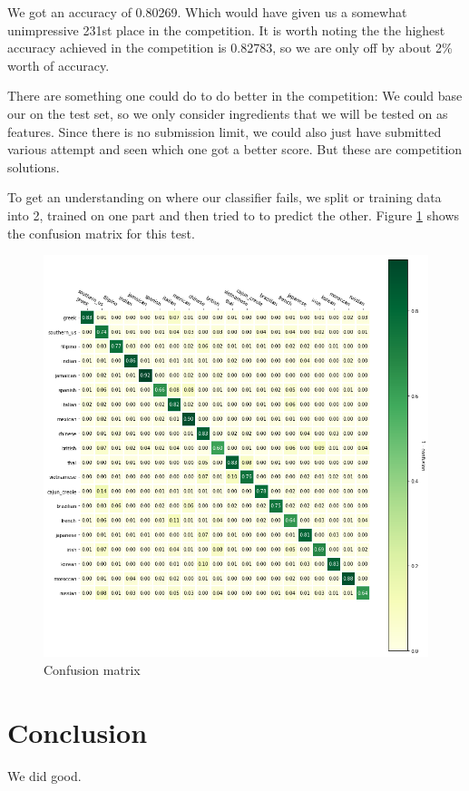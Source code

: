 \documentclass[parskip=half]{scrartcl}
\theoremstyle{definition}
\theoremstyle{remark}
\newcommand{\funcname}[1]{{\color{blue}{\texttt{#1}}}}
\begin{document}
We got an accuracy of 0.80269. 
Which would have given us a somewhat unimpressive 231st place in the competition. 
It is worth noting the the highest accuracy achieved in the competition is 0.82783, so we are only off by about 2\% worth of accuracy. 

There are something one could do to do better in the competition:
We could base our \funcname{CountVectorizer} on the test set, so we only consider ingredients that we will be tested on as features. 
Since there is no submission limit, we could also just have submitted various attempt and seen which one got a better score.
But these are competition solutions. 

To get an understanding on where our classifier fails, we split or training data into 2, trained on one part and then tried to to predict the other.
Figure \ref{fig:confusion} shows the confusion matrix for this test. 

 
\begin{figure}[H]
\caption{Confusion matrix} \label{fig:confusion}
\centering
\includegraphics[scale=0.6]{images/confusion.png}
\end{figure}

\section{Conclusion} \label{sec:conclusion}

We did good.


\end{document}
